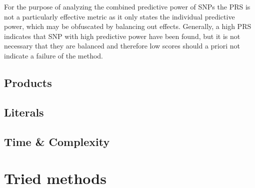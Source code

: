\documentclass[letterpaper, 11pt]{article}
\begin{document}
\begin{figure} [!h] \end{figure}

For the purpose of analyzing the combined predictive power of SNPs the PRS is not a particularly effective metric as it only states the individual predictive power, which may be obfuscated by balancing out effects. Generally, a high PRS indicates that SNP with high predictive power have been found, but it is not necessary that they are balanced and therefore low scores should a priori not indicate a failure of the method. \\


\subsection{Products}
\subsection{Literals}
\subsection{Time \& Complexity}
\section{ Tried methods}
\end{document}
